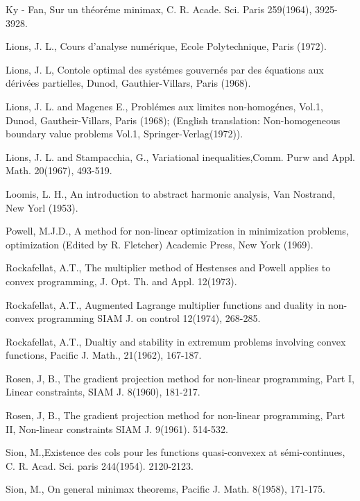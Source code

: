 \begin{thebibliography}{99}
 {Ky - Fan}, Sur un th\'{e}or\'{e}me minimax,
  C. R. Acade. Sci. Paris 259(1964), 3925-3928.  

 {Lions, J. L}., Cours d'analyse num\'{e}rique, Ecole
  Polytechnique, Paris (1972).  

 {Lions, J. L}, Contole optimal des syst\'{e}mes
  gouvern\'{e}s par des \'{e}quations aux d\'{e}riv\'{e}es partielles,
  Dunod, Gauthier-Villars, Paris (1968).  

 {Lions, J. L. and Magenes E}., Probl\'{e}mes aux
  limites non-homog\'{e}nes, Vol.1, Dunod, Gautheir-Villars, Paris
  (1968); (English translation: Non-homogeneous boundary value
  problems Vol.1, Springer-Verlag(1972)).  

 {Lions, J. L. and Stampacchia, G}., Variational
  inequalities,Comm. Purw and Appl. Math. 20(1967), 493-519.  

 {Loomis, L. H.}, An introduction to abstract harmonic
  analysis, Van Nostrand, New Yorl (1953).  

 {Powell, M.J.D.}, A method for non-linear optimization
  in minimization problems, optimization (Edited by R. Fletcher)
  Academic Press, New York (1969).  

 {Rockafellat, A.T.}, The multiplier method of
  Hestenses and Powell applies to convex programming, J. Opt. Th. and
  Appl. 12(1973).  

 {Rockafellat, A.T.}, Augmented Lagrange multiplier
  functions and duality in non-convex programming SIAM J. on control
  12(1974), 268-285.  

 {Rockafellat, A.T.}, Dualtiy and stability in extremum
  problems involving convex functions, Pacific J. Math., 21(1962),
  167-187.  

 {Rosen, J, B.}, The gradient projection method for
  non-linear programming, Part I, Linear constraints, SIAM J. 8(1960),
  181-217.  

 {Rosen, J, B.}, The gradient projection method for
  non-linear programming, Part II, Non-linear constraints SIAM
  J. 9(1961). 514-532.  

 {Sion, M.},\pageoriginale Existence des cols pour les
  functions quasi-convexex at s\'{e}mi-continues,
  C. R. Acad. Sci. paris 244(1954). 2120-2123.  

 {Sion, M.}, On general minimax theorems, Pacific
  J. Math. 8(1958), 171-175.  


\end{thebibliography}
